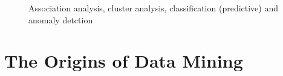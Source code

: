 	\begin{figure}[H]
		\centering
		\caption{Association analysis, cluster analysis, classification (predictive) 
		and anomaly detction}
	\end{figure}

\section{The Origins of Data Mining}

